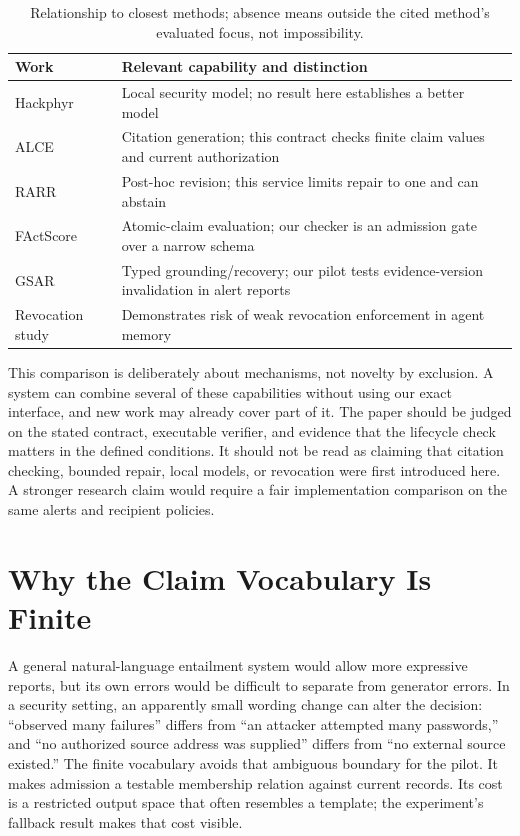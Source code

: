 \begin{table}[t]
\centering\caption{Relationship to closest methods; absence means outside the cited method's evaluated focus, not impossibility.}
\label{tab:prior}
\begin{tabular}{p{}p{}}
\hline
Work & Relevant capability and distinction\\\hline
Hackphyr & Local security model; no result here establishes a better model\\
ALCE & Citation generation; this contract checks finite claim values and current authorization\\
RARR & Post-hoc revision; this service limits repair to one and can abstain\\
FActScore & Atomic-claim evaluation; our checker is an admission gate over a narrow schema\\
GSAR & Typed grounding/recovery; our pilot tests evidence-version invalidation in alert reports\\
Revocation study & Demonstrates risk of weak revocation enforcement in agent memory\\\hline
\end{tabular}
\end{table}

This comparison is deliberately about mechanisms, not novelty by exclusion. A system can combine several of these capabilities without using our exact interface, and new work may already cover part of it. The paper should be judged on the stated contract, executable verifier, and evidence that the lifecycle check matters in the defined conditions. It should not be read as claiming that citation checking, bounded repair, local models, or revocation were first introduced here. A stronger research claim would require a fair implementation comparison on the same alerts and recipient policies.

\section{Why the Claim Vocabulary Is Finite}
A general natural-language entailment system would allow more expressive reports, but its own errors would be difficult to separate from generator errors. In a security setting, an apparently small wording change can alter the decision: ``observed many failures'' differs from ``an attacker attempted many passwords,'' and ``no authorized source address was supplied'' differs from ``no external source existed.'' The finite vocabulary avoids that ambiguous boundary for the pilot. It makes admission a testable membership relation against current records. Its cost is a restricted output space that often resembles a template; the experiment's fallback result makes that cost visible.

